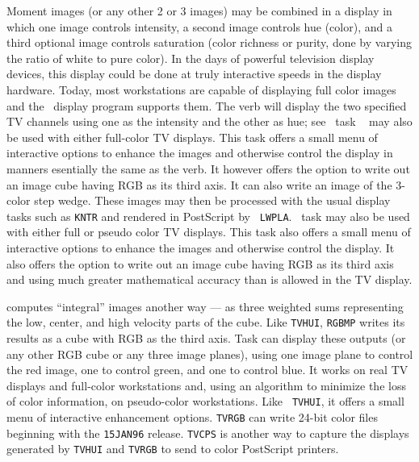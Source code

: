      Moment images (or any other 2 or 3 images) may be combined in a
display in which one image controls intensity, a second image controls
hue (color), and a third optional image controls saturation (color
richness or purity, done by varying the ratio of white to pure color).
In the days of powerful television display devices, this display could
be done at truly interactive speeds in the display hardware.  Today,
most workstations are capable of displaying full color images and the
\AIPS\ display program supports them.  The verb {\tt {}}
will display the two specified TV channels using one as the intensity
and the other as hue; see   \AIPS\ task {\tt
{}} may also be used with either full-color TV displays.
This task offers a small menu of interactive options to enhance the
images and otherwise control the display in manners esentially the
same as the verb.  It however offers the option to write out an image
cube having RGB as its third axis. It can also write an image of the
3-color step wedge.  These images may then be processed with the usual
display tasks such as {\tt KNTR} and rendered in PostScript by {\tt
LWPLA}\@.  \AIPS\ task {\tt {}} may also be used with either
full or pseudo color TV displays.  This task also offers a small menu
of interactive options to enhance the images and otherwise control the
display.  It also offers the option to write out an image cube having
RGB as its third axis and using much greater mathematical accuracy
than is allowed in the TV display.

  {\tt {}} computes ``integral'' images another way --- as
three weighted sums representing the low, center, and high velocity
parts of the cube.  Like {\tt TVHUI}, {\tt RGBMP} writes its results
as a cube with RGB as the third axis.  Task {\tt {}} can
display these outputs (or any other RGB cube or any three image
planes), using one image plane to control the red image, one to
control green, and one to control blue.  It works on real TV displays
and full-color workstations and, using an algorithm to minimize the
loss of color information, on pseudo-color workstations.  Like {\tt
TVHUI}, it offers a small menu of interactive enhancement options.
{\tt TVRGB} can write 24-bit color  files beginning
with the {\tt 15JAN96} release. {\tt TVCPS} is another way to capture
the displays generated by {\tt TVHUI} and {\tt TVRGB} to send to color
PostScript printers.

